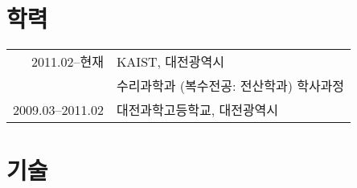 \documentclass[a4paper,10pt]{article}
\begin{document}
\section{학력}
\begin{tabular}{rl}
  2011.02--현재 & KAIST, 대전광역시 \\
  & \textsc{수리과학과} (복수전공: \textsc{전산학과}) 학사과정 \\
  2009.03--2011.02 & 대전과학고등학교, 대전광역시
\end{tabular}


\section{기술}


\end{document}

